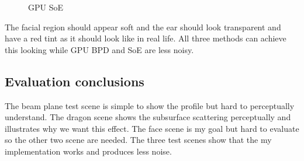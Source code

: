 \documentclass[letterpaper,12pt]{article}
\begin{document}
\begin{figure}[H]
    \centering
    \caption{GPU SoE}%
    \label{}%
\end{figure}

The facial region should appear soft and the ear should look transparent and have a red tint as it should look like in real life. All three methods can achieve this looking while GPU BPD and SoE are less noisy.

\subsection{Evaluation conclusions}

The beam plane test scene is simple to show the profile but hard to perceptually understand. The dragon scene shows the subsurface scattering perceptually and illustrates why we want this effect. The face scene is my goal but hard to evaluate so the other two scene are needed. The three test scenes show that the my implementation works and produces less noise.
\end{document}
